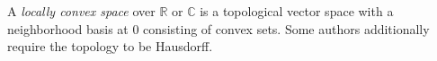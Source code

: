 
A \emph{locally convex space} over $\mathbb R$ or $\mathbb C$ is a topological vector space with a neighborhood basis at $0$ consisting of convex sets. Some authors additionally require the topology to be Hausdorff.
